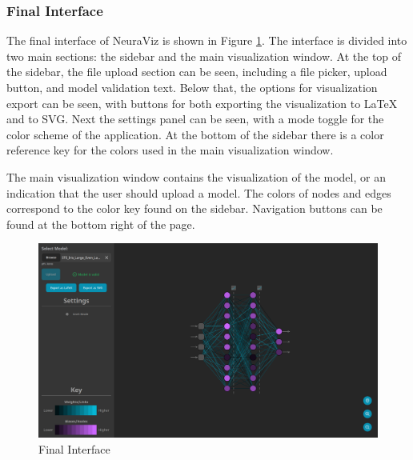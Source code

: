 \subsubsection{Final Interface}
The final interface of NeuraViz is shown in Figure \ref{fig:ui_final}. The interface is divided into two main sections: the sidebar and the main visualization window. At the top of the sidebar, the file upload section can be seen, including a file picker, upload button, and model validation text. Below that, the options for visualization export can be seen, with buttons for both exporting the visualization to LaTeX and to SVG. Next the settings panel can be seen, with a mode toggle for the color scheme of the application. At the bottom of the sidebar there is a color reference key for the colors used in the main visualization window. 

The main visualization window contains the visualization of the model, or an indication that the user should upload a model. The colors of nodes and edges correspond to the color key found on the sidebar. Navigation buttons can be found at the bottom right of the page.

\begin{figure}[ht]
    \centering
    \includegraphics[width=1\textwidth]{03_design/res/final_interface.png}
    \caption{Final Interface}
    \label{fig:ui_final}
\end{figure}